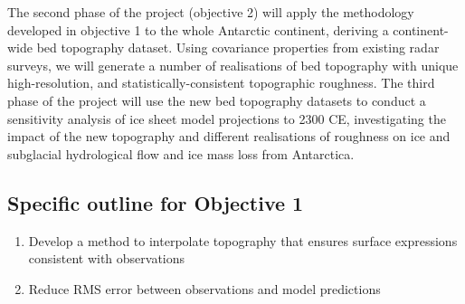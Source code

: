 The second phase of the project (objective 2) will apply the methodology developed in objective 1 to the whole Antarctic continent, deriving a continent-wide bed topography dataset. Using covariance properties from existing radar surveys, we will generate a number of realisations of bed topography with unique high-resolution, and statistically-consistent topographic roughness. The third phase of the project will use the new bed topography datasets to conduct a sensitivity analysis of ice sheet model projections to 2300 CE, investigating the impact of the new topography and different realisations of roughness on ice and subglacial hydrological flow and ice mass loss from Antarctica.


\subsection*{Specific outline for Objective 1}
\begin{enumerate}
\item Develop a method to interpolate topography that ensures surface expressions consistent with observations
\item Reduce RMS error between observations and model predictions
\end{enumerate}

